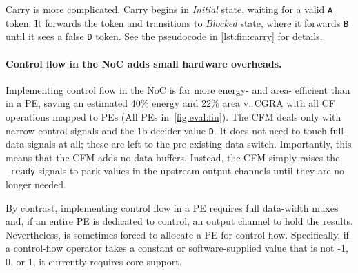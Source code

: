 Carry is more complicated.
%
Carry begins in {\em Initial} state, waiting for a valid {\tt A}
token.
%
It forwards the token and transitions to {\em Blocked} state, where
it forwards {\tt B} until it sees a false {\tt D} token.
%
See the pseudocode in \autoref{lst:fin:carry} for details.

\paragraph{Control flow in the NoC adds small hardware overheads.}
%
Implementing control flow in the NoC is far more energy- and
area- efficient than in a PE, saving an estimated 40\% energy and 22\% area v. CGRA with all CF operations mapped to PEs (All PEs in~\autoref{fig:eval:fin}).
%
The CFM deals only with narrow control signals and the 1b decider
value {\tt D}.
%
It does not need to touch full data signals at all; these are
left to the pre-existing data switch.
%
Importantly, this means that the CFM adds no data buffers.
%
Instead, the CFM simply raises the {\tt *\_ready} signals to park
values in the upstream output channels until they are no longer
needed.

By contrast, implementing control flow in a PE requires full
data-width muxes and, if an entire PE is dedicated to control, an
output channel to hold the results.
%
Nevertheless, \riptide is sometimes forced to allocate a PE for control
flow.
%
Specifically, if a control-flow operator takes a constant or
software-supplied value that is not -1, 0, or 1, it currently requires \textmu core support.




  

